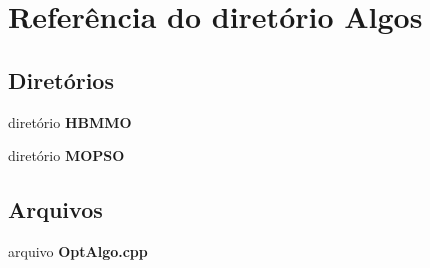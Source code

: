 \section{Referência do diretório Algos}
\label{dir_a4c7aef5cb7d0c2d3f9a1f5b679c1e71}
\subsection*{Diretórios}
\begin{DoxyCompactItemize}
\item 
diretório {\bf H\+B\+M\+MO}
\item 
diretório {\bf M\+O\+P\+SO}
\end{DoxyCompactItemize}
\subsection*{Arquivos}
\begin{DoxyCompactItemize}
\item 
arquivo {\bf Opt\+Algo.\+cpp}
\end{DoxyCompactItemize}
